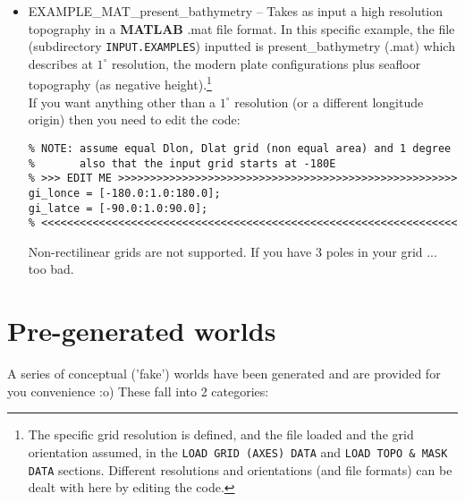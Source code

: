\documentclass[11pt,fleqn]{book} %
\begin{document}
\begin{itemize}[noitemsep]
\vspace{1mm}
\item \textsf{\footnotesize EXAMPLE\_MAT\_present\_bathymetry} -- Takes as input a high resolution topography in a \textbf{MATLAB} \textsf{\footnotesize .mat} file format. In this specific example, the file (subdirectory \texttt{INPUT.EXAMPLES}) inputted is \textsf{\footnotesize present\_bathymetry} (\textsf{\footnotesize .mat}) which describes at \(1^{\circ}\) resolution, the modern plate configurations plus seafloor topography (as negative height).\footnote{The specific grid resolution is defined, and the file loaded and the grid orientation assumed, in the \texttt{LOAD GRID (AXES) DATA} and \texttt{LOAD TOPO \& MASK DATA} sections. Different resolutions and orientations (and file formats) can be dealt with here by editing the code.}
\\If you want anything other than a \(1^{\circ}\) resolution (or a different longitude origin) then you need to edit the code:
\small\begin{verbatim}
% NOTE: assume equal Dlon, Dlat grid (non equal area) and 1 degree
%       also that the input grid starts at -180E
% >>> EDIT ME >>>>>>>>>>>>>>>>>>>>>>>>>>>>>>>>>>>>>>>>>>>>>>>>>>>>>
gi_lonce = [-180.0:1.0:180.0];
gi_latce = [-90.0:1.0:90.0];
% <<<<<<<<<<<<<<<<<<<<<<<<<<<<<<<<<<<<<<<<<<<<<<<<<<<<<<<<<<<<<<<<<
\end{verbatim}\normalsize
Non-rectilinear grids are not supported. If you have 3 poles in your grid ... too bad.

\end{itemize}
\vspace{2mm}


\newpage

\section{Pre-generated worlds}

A series of conceptual ('fake') worlds have been generated and are provided for you convenience :o) These fall into 2 categories:
\end{document}
